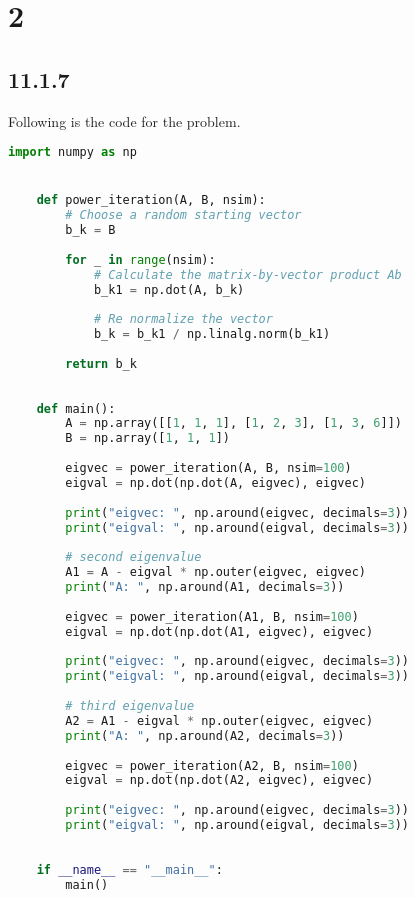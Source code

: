 \documentclass{article}
\begin{document}
\section*{2}
\subsection*{11.1.7}
Following is the code for the problem.

\begin{lstlisting}[language=Python]
    import numpy as np


    def power_iteration(A, B, nsim):
        # Choose a random starting vector
        b_k = B
    
        for _ in range(nsim):
            # Calculate the matrix-by-vector product Ab
            b_k1 = np.dot(A, b_k)
    
            # Re normalize the vector
            b_k = b_k1 / np.linalg.norm(b_k1)
    
        return b_k
    
    
    def main():
        A = np.array([[1, 1, 1], [1, 2, 3], [1, 3, 6]])
        B = np.array([1, 1, 1])
    
        eigvec = power_iteration(A, B, nsim=100)
        eigval = np.dot(np.dot(A, eigvec), eigvec)
    
        print("eigvec: ", np.around(eigvec, decimals=3))
        print("eigval: ", np.around(eigval, decimals=3))
    
        # second eigenvalue
        A1 = A - eigval * np.outer(eigvec, eigvec)
        print("A: ", np.around(A1, decimals=3))
    
        eigvec = power_iteration(A1, B, nsim=100)
        eigval = np.dot(np.dot(A1, eigvec), eigvec)
    
        print("eigvec: ", np.around(eigvec, decimals=3))
        print("eigval: ", np.around(eigval, decimals=3))
    
        # third eigenvalue
        A2 = A1 - eigval * np.outer(eigvec, eigvec)
        print("A: ", np.around(A2, decimals=3))
    
        eigvec = power_iteration(A2, B, nsim=100)
        eigval = np.dot(np.dot(A2, eigvec), eigvec)
    
        print("eigvec: ", np.around(eigvec, decimals=3))
        print("eigval: ", np.around(eigval, decimals=3))
    
    
    if __name__ == "__main__":
        main()    
\end{lstlisting}
\end{document}
